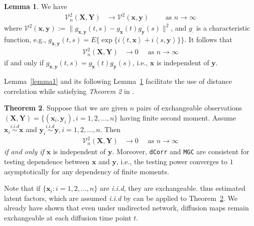 \documentclass[12pt]{article}
\theoremstyle{definition}
\newtheorem{theorem}{Theorem}[section]
\newtheorem{lemma}[theorem]{Lemma}
\begin{document}
\begin{lemma}
	\label{lemma2}
We have 
	\begin{eqnarray}
		\mathcal{V}_{n}^{2}(\mathbf{X},\mathbf{Y}) &\longrightarrow \mathcal{V}^{2}(\mathbf{x},\mathbf{y}) \quad \quad \mbox{ as } n \rightarrow \infty
	\label{eq:conv1}
	\end{eqnarray}
where $\mathcal{V}^{2} (\mathbf{x},\mathbf{y}) := \| g_{\mathbf{x},\mathbf{y}}(t,s) - g_{\mathbf{x}}(t) g_{\mathbf{y}}(s) \|^2$, and $g_{\cdot}$ is a characteristic function, e.g., $g_{\mathbf{x},\mathbf{y}}(t,s) = E\{\exp\{i \left\langle t,\mathbf{x} \right\rangle  +i \left\langle  s,\mathbf{y}\right\rangle \}\}$.
	It follows that 
	\begin{eqnarray}
		\mathcal{V}_{n}^{2}(\mathbf{X},\mathbf{Y}) &\rightarrow 0 \quad \mbox{ as } n \rightarrow \infty
		\label{eq:conv2}
	\end{eqnarray}
	if and only if $g_{\mathbf{x},\mathbf{y}}(t,s) = g_{\mathbf{x}}(t) g_{\mathbf{y}}(s)$, i.e., $\mathbf{x}$ is independent of $\mathbf{y}$.
\end{lemma}
Lemma~\ref{lemma1} and its following Lemma~\ref{lemma2} facilitate the use of distance correlation while satisfying \textit{Theorem 2} in \cite{szekely2007measuring}.  

\begin{theorem}
	Suppose that we are given $n$ pairs of exchangeable observations $(\mathbf{X}, \mathbf{Y}) = \{  (\mathbf{x}_{i}, \mathbf{y}_{i} ), i = 1,2, \ldots, n \}$ having finite second moment. Assume $\mathbf{x}_{i} \overset{i.i.d}{\sim} \mathbf{x}$ and $\mathbf{y}_{i} \overset{i.i.d}{\sim} \mathbf{y}, i = 1,2, \ldots, n$. Then
	\begin{eqnarray}
		\mathcal{V}_{n}^{2}(\mathbf{X},\mathbf{Y}) &\longrightarrow 0 \quad \mbox{ as } n \rightarrow \infty
	\end{eqnarray}	
	\textit{if and only if} $\mathbf{x}$ is independent of $\mathbf{y}$. Moreover, \texttt{dCorr} and \texttt{MGC} are consistent for testing dependence between $\mathbf{x}$ and $\mathbf{y}$, i.e., the testing power converges to $1$ asymptotically for any dependency of finite moments.
	\label{theoremMain}
\end{theorem}

Note that if $\{ \mathbf{x}_{i} : i = 1,2,\ldots, n \}$ are \textit{i.i.d}, they are exchangeable. thus estimated latent factors, which are assumed \textit{i.i.d} by \cite{fosdick2015testing} can be applied to Theorem~\ref{theoremMain}. We already have shown that even under undirected network, diffusion maps remain exchangeable at each diffusion time point $t$. 
\end{document}
